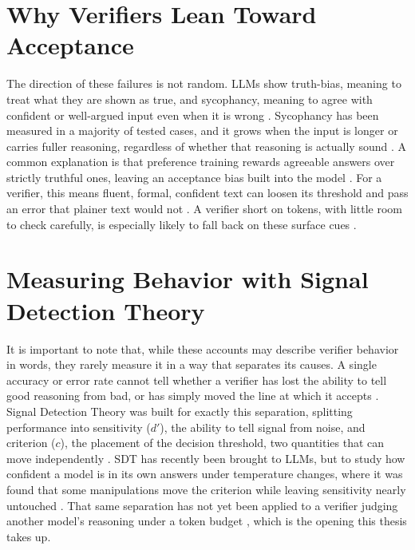 \documentclass[12pt, a4paper, oneside]{report}
\begin{document}
\section{Why Verifiers Lean Toward Acceptance}
The direction of these failures is not random. LLMs show truth-bias, meaning to treat what they are shown as true, and sycophancy, meaning to agree with confident or well-argued input even when it is wrong \parencite{Fanous2025, Barkett2025}. Sycophancy has been measured in a majority of tested cases, and it grows when the input is longer or carries fuller reasoning, regardless of whether that reasoning is actually sound \parencite{Fanous2025, Kim2025}. A common explanation is that preference training rewards agreeable answers over strictly truthful ones, leaving an acceptance bias built into the model \parencite{Barkett2025}. For a verifier, this means fluent, formal, confident text can loosen its threshold and pass an error that plainer text would not \parencite{Kim2025}. A verifier short on tokens, with little room to check carefully, is especially likely to fall back on these surface cues \parencite{Kim2025}.

\section{Measuring Behavior with Signal Detection Theory}
It is important to note that, while these accounts may describe verifier behavior in words, they rarely measure it in a way that separates its causes. A single accuracy or error rate cannot tell whether a verifier has lost the ability to tell good reasoning from bad, or has simply moved the line at which it accepts \parencite{Cacioli2026}. Signal Detection Theory was built for exactly this separation, splitting performance into sensitivity ($d'$), the ability to tell signal from noise, and criterion ($c$), the placement of the decision threshold, two quantities that can move independently \parencite{Cacioli2026}. SDT has recently been brought to LLMs, but to study how confident a model is in its own answers under temperature changes, where it was found that some manipulations move the criterion while leaving sensitivity nearly untouched \parencite{Cacioli2026}. That same separation has not yet been applied to a verifier judging another model's reasoning under a token budget \parencite{Cacioli2026}, which is the opening this thesis takes up.
\end{document}

